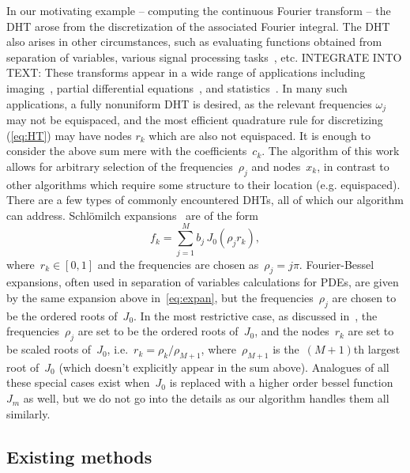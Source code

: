 In our motivating example -- computing the continuous Fourier transform -- the
DHT arose from the discretization of the associated Fourier integral. The DHT
also arises in other circumstances, such as evaluating functions obtained from
separation of variables, various signal processing tasks~\cite{},
etc.{\color{red} INTEGRATE INTO TEXT: These transforms appear in a wide range of
applications including imaging~\cite{higgins1988hankel, zhao2013fourier},
partial differential equations~\cite{bisseling1985fast,ali1999generalized}, and
statistics~\cite{lord1954a, genton2002nonparametric}. In many such applications,
a fully nonuniform DHT is desired, as the relevant frequencies $\omega_j$ may
not be equispaced, and the most efficient quadrature rule for discretizing
(\ref{eq:HT}) may have nodes $r_k$ which are also not equispaced. } It is enough
to consider the above sum mere with the coefficients~$c_k$. The algorithm of
this work allows for arbitrary selection of the frequencies~$\rho_j$ and
nodes~$x_k$, in contrast to other algorithms which require some structure to
their location (e.g. equispaced). There are a few types of commonly encountered
DHTs, all of which our algorithm can address. Schl\"omilch expansions~\cite{}
are of the form
\begin{equation}
  \label{eq:expan}
  f_k = \sum_{j = 1}^M b_j \, J_0(\rho_j r_k),
\end{equation}
where~$r_k \in [0,1]$ and the frequencies are chosen as~$\rho_j = j\pi$.
Fourier-Bessel expansions, often used in separation of variables calculations
for PDEs, are given by the same expansion above in~\eqref{eq:expan}, but the
frequencies~$\rho_j$ are chosen to be the ordered roots of~$J_0$. In the most
restrictive case, as discussed in~\cite{johnson1987}, the frequencies~$\rho_j$
are set to be the ordered roots of~$J_0$, and the nodes~$r_k$ are set to be
scaled roots of~$J_0$, i.e.~$r_k = \rho_k/\rho_{M+1}$, where~$\rho_{M+1}$ is
the~$(M+1)$th largest root of~$J_0$ (which doesn't explicitly appear in the sum
above). Analogues of all these special cases exist when~$J_0$ is replaced with a
higher order bessel function~$J_m$ as well, but we do not go into the details as
our algorithm handles them all similarly.




\subsection*{Existing methods}
\label{sec:existing}

